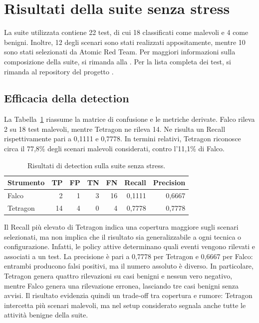 \documentclass[12pt,a4paper,openright,twoside]{book}
\begin{document}
\section{Risultati della suite senza stress}
\label{sec:results-no-stress}

La suite utilizzata contiene 22 test, di cui 18 classificati come malevoli e 4 come benigni. Inoltre, 12 degli scenari sono stati realizzati appositamente, mentre 10 sono stati selezionati da Atomic Red Team. Per maggiori informazioni sulla composizione della suite, si rimanda alla . Per la lista completa dei test, si rimanda al repository del progetto \cite{repo-test-harness}.

\subsection{Efficacia della detection}

La Tabella~\ref{tab:results-detection} riassume la matrice di confusione e le metriche derivate. Falco rileva 2 su 18 test malevoli, mentre Tetragon ne rileva 14. Ne risulta un Recall rispettivamente pari a 0,1111 e 0,7778. In termini relativi, Tetragon riconosce circa il 77,8\% degli scenari malevoli considerati, contro l'11,1\% di Falco.

\begin{table}[htbp]
    \centering
    \caption{Risultati di detection sulla suite senza stress.}
    \label{tab:results-detection}
    \small
    \renewcommand{\arraystretch}{1.2}
    \begin{tabularx}{\linewidth}{>{\raggedright\arraybackslash}X r r r r r r}
        \hline
        \textbf{Strumento} & \textbf{TP} & \textbf{FP} & \textbf{TN} & \textbf{FN} & \textbf{Recall} & \textbf{Precision} \\
        \hline
        Falco & 2 & 1 & 3 & 16 & 0,1111 & 0,6667 \\
        Tetragon & 14 & 4 & 0 & 4 & 0,7778 & 0,7778 \\
        \hline
    \end{tabularx}
\end{table}

Il Recall più elevato di Tetragon indica una copertura maggiore sugli scenari selezionati, ma non implica che il risultato sia generalizzabile a ogni tecnica o configurazione. Infatti, le policy attive determinano quali eventi vengono rilevati e associati a un test. La precisione è pari a 0,7778 per Tetragon e 0,6667 per Falco: entrambi producono falsi positivi, ma il numero assoluto è diverso. In particolare, Tetragon genera quattro rilevazioni su casi benigni e nessun vero negativo, mentre Falco genera una rilevazione erronea, lasciando tre casi benigni senza avvisi. Il risultato evidenzia quindi un trade-off tra copertura e rumore: Tetragon intercetta più scenari malevoli, ma nel setup considerato segnala anche tutte le attività benigne della suite.
\end{document}

